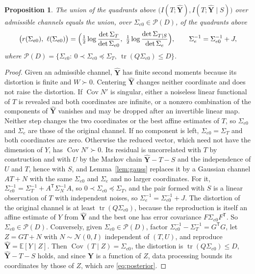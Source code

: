 \documentclass[11pt,onecolumn]{IEEEtran}
\newtheorem{proposition}[theorem]{Proposition}
\newcommand{\E}{\mathbb{E}}
\newcommand{\tr}{\operatorname{tr}}
\newcommand{\Cov}{\operatorname{Cov}}
\newcommand{\hY}{\hat{\mathbf Y}}
\newcommand{\Se}{\Sigma_{e}}
\newcommand{\Sez}{\Sigma_{e0}}
\newcommand{\Kc}{\Sigma_{T\mid S}}
\begin{document}
\begin{proposition}\label{prop:posterior}
The union of the quadrants above
$\bigl(I(T;\hY),I(T;\hY\mid S)\bigr)$ over admissible channels equals the
union, over $\Sez\in\mathcal P(D)$, of the quadrants above
\begin{equation}
\bigl(r(\Sez),\ \ell(\Sez)\bigr)
=\Bigl(\tfrac12\log\frac{\det\Sigma_T}{\det\Sez},\
\tfrac12\log\frac{\det\Kc}{\det\Se}\Bigr),
\qquad
\Se^{-1}=\Sez^{-1}+J,
\label{eq:posterior}
\end{equation}
where $\mathcal P(D)=\{\Sez:\ 0\prec\Sez\preceq\Sigma_T,\ \tr(Q\Sez)\le D\}$.
\end{proposition}

\begin{proof}
Given an admissible channel, $\hY$ has finite second moments because
its distortion is finite and $W\succ0$. Centering $\hY$ changes neither
coordinate and does not raise the distortion. If $\Cov N'$ is singular, either a
noiseless linear functional of $T$ is revealed and both coordinates are
infinite, or a nonzero combination of the components of $\hY$ vanishes
and may be dropped after an invertible linear map. Neither step
changes the two coordinates or the best affine estimates of $T$, so
$\Sez$ and $\Se$ are those of the original channel. If no component is
left, $\Sez=\Sigma_T$ and both coordinates are zero. Otherwise the
reduced vector, which need not have the dimension of $Y$, has
$\Cov N'\succ0$. Its residual is uncorrelated with $T$ by construction
and with $U$ by the Markov chain $\hY-T-S$ and the independence of $U$
and $T$, hence with $S$, and Lemma~\ref{lem:gauss}
replaces it by a Gaussian channel $AT+N$ with the same $\Sez$ and $\Se$
and no larger coordinates. For it,
$\Sez^{-1}=\Sigma_T^{-1}+A^{\mathsf T}\Sigma_N^{-1}A$, so
$0\prec\Sez\preceq\Sigma_T$, and the pair formed with $S$ is a linear
observation of $T$ with independent noises, so $\Se^{-1}=\Sez^{-1}+J$. The
distortion of the original channel is at least $\tr(Q\Sez)$, because
the reproduction is itself an affine estimate of $Y$ from $\hY$ and the
best one has error covariance $F\Sez F^{\mathsf T}$. So $\Sez\in\mathcal P(D)$.
Conversely, given $\Sez\in\mathcal P(D)$, factor
$\Sez^{-1}-\Sigma_T^{-1}=G^{\mathsf T}G$, let $Z=GT+N$ with
$N\sim\mathcal N(0,I)$ independent of $(T,U)$, and reproduce
$\hY=\E[Y\mid Z]$. Then $\Cov(T\mid Z)=\Sez$, the distortion is
$\tr(Q\Sez)\le D$, $\hY-T-S$ holds, and since $\hY$ is a function of $Z$,
data processing bounds its coordinates by those of $Z$, which are
\eqref{eq:posterior}.
\end{proof}
\end{document}
